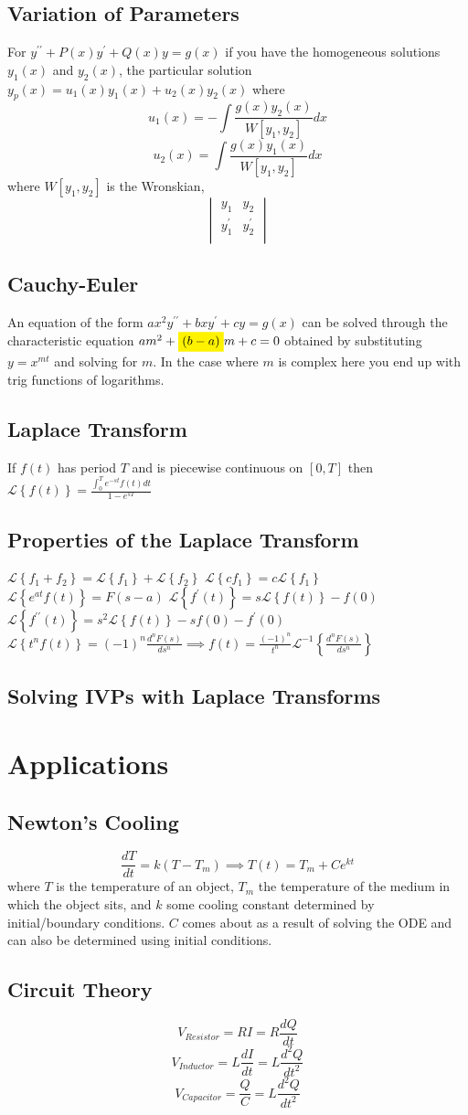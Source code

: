 \documentclass[10pt,landscape,letterpaper]{cheatsheet}
\newcommand{\laplace}[1]{\mathcal{L}\left\{#1\right\}}
\newcommand{\laplacei}[1]{\mathcal{L}^{-1}\left\{#1\right\}}
\newcommand{\highlight}[1]{\colorbox{yellow}{$\displaystyle #1$}}
\begin{document}
\subsection*{Variation of Parameters}
For $y^{\prime\prime}+P(x)y^{\prime}+Q(x)y=g(x)$ if you have the homogeneous solutions $y_1(x)$ and $y_2(x)$, the particular solution $y_p(x)=u_1(x)y_1(x)+u_2(x)y_2(x)$ where
$$u_1(x)=-\int\frac{g(x)y_2(x)}{W\left[y_1, y_2\right]}dx$$
$$u_2(x)=\int\frac{g(x)y_1(x)}{W\left[y_1, y_2\right]}dx$$
where $W\left[y_1, y_2\right]$ is the Wronskian, 
$$\begin{vmatrix}
                y_1          & y_2          \\ 
                y_1^{\prime} & y_2^{\prime} \\
        \end{vmatrix}$$
\subsection*{Cauchy-Euler}
An equation of the form $ax^2y^{\prime\prime}+bxy^{\prime}+cy=g(x)$ can be solved through the characteristic equation $am^2+\highlight{(b-a)}m+c=0$ obtained by substituting $y=x^{mt}$ and solving for $m$. 
In the case where $m$ is complex here you end up with trig functions of logarithms.
\subsection*{Laplace Transform}
If $f(t)$ has period $T$ and is piecewise continuous on $[0,T]$ then $\laplace{f(t)}=\frac{\int_{0}^{T}e^{-st}f(t)dt}{1-e^{sT}}$
\subsection*{Properties of the Laplace Transform}
$\laplace{f_1+f_2}=\laplace{f_1}+\laplace{f_2}$
$\laplace{cf_1}=c\laplace{f_1}$
$\laplace{e^{at}f(t)}=F(s-a)$
$\laplace{f^\prime(t)}=s\laplace{f(t)}-f(0)$
$\laplace{f^{\prime\prime}(t)}=s^2\laplace{f(t)}-sf(0)-f^\prime(0)$
$\laplace{t^nf(t)}=(-1)^n\frac{d^nF(s)}{ds^n}\implies f(t)=\frac{\left(-1\right)^{n}}{t^n}\laplacei{\frac{d^nF(s)}{ds^n}}$
\subsection*{Solving IVPs with Laplace Transforms}
\section*{Applications}
\subsection*{Newton's Cooling}
$$\frac{dT}{dt}=k(T-T_m)\implies T(t)=T_m+Ce^{kt}$$ where $T$ is the temperature of an object, $T_m$ the temperature of the medium in which the object sits, and $k$ some cooling constant determined by initial/boundary conditions.
$C$ comes about as a result of solving the ODE and can also be determined using initial conditions.
\subsection*{Circuit Theory}
$$V_{Resistor}=RI=R\frac{dQ}{dt}$$
$$V_{Inductor}=L\frac{dI}{dt}=L\frac{d^2Q}{dt^2}$$
$$V_{Capacitor}=\frac{Q}{C}=L\frac{d^2Q}{dt^2}$$
\end{document}

